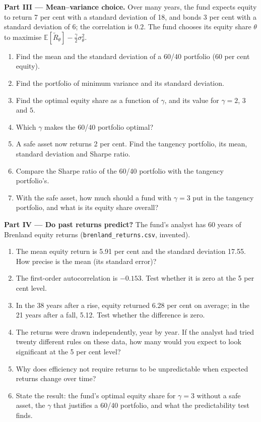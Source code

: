 \begin{problem}
\medskip
\noindent\textbf{Part III --- Mean--variance choice.} Over many years, the fund expects equity to
return 7 per cent with a standard deviation of 18, and bonds 3 per cent with a standard deviation of
6; the correlation is $0.2$. The fund chooses its equity share $\theta$ to maximise
$\mathbb{E}[\tilde R_\theta] - \tfrac{\gamma}{2}\sigma^2_\theta$.
\begin{enumerate}[resume]
  \item Find the mean and the standard deviation of a 60/40 portfolio (60 per cent equity).
  \item Find the portfolio of minimum variance and its standard deviation.
  \item Find the optimal equity share as a function of $\gamma$, and its value for $\gamma = 2$, $3$ and
        $5$.
  \item Which $\gamma$ makes the 60/40 portfolio optimal?
  \item A safe asset now returns 2 per cent. Find the tangency portfolio, its mean, standard deviation
        and Sharpe ratio.
  \item Compare the Sharpe ratio of the 60/40 portfolio with the tangency portfolio's.
  \item With the safe asset, how much should a fund with $\gamma = 3$ put in the tangency portfolio,
        and what is its equity share overall?
\end{enumerate}

\medskip
\noindent\textbf{Part IV --- Do past returns predict?} The fund's analyst has 60 years of Brenland
equity returns (\texttt{brenland\_returns.csv}, invented).
\begin{enumerate}[resume]
  \item The mean equity return is 5.91 per cent and the standard deviation 17.55. How precise is the
        mean (its standard error)?
  \item The first-order autocorrelation is $-0.153$. Test whether it is zero at the 5 per cent level.
  \item In the 38 years after a rise, equity returned 6.28 per cent on average; in the 21 years after a
        fall, 5.12. Test whether the difference is zero.
  \item The returns were drawn independently, year by year. If the analyst had tried twenty different
        rules on these data, how many would you expect to look significant at the 5 per cent level?
  \item Why does efficiency not require returns to be unpredictable when expected returns change over
        time?
  \item State the result: the fund's optimal equity share for $\gamma = 3$ without a safe asset, the
        $\gamma$ that justifies a 60/40 portfolio, and what the predictability test finds.
\end{enumerate}
\end{problem}
